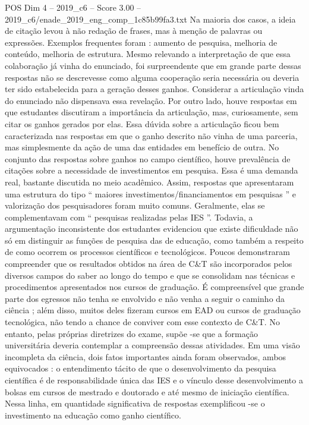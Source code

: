 \begin{textsample}{POS Dim 4 – 2019\_c6 – Score 3.00 – 2019\_c6/enade\_2019\_eng\_comp\_1c85b99fa3.txt}
Na maioria dos casos, a ideia de citação levou à não redação de frases, mas à menção de palavras ou expressões.
Exemplos frequentes foram : aumento de pesquisa, melhoria de conteúdo, melhoria de estrutura.
Mesmo relevando a interpretação de que essa colaboração já vinha do enunciado, foi surpreendente que em grande parte dessas respostas não se descrevesse como alguma cooperação seria necessária ou deveria ter sido estabelecida para a geração desses ganhos.
Considerar a articulação vinda do enunciado não dispensava essa revelação.
Por outro lado, houve respostas em que estudantes discutiram a importância da articulação, mas, curiosamente, sem citar os ganhos gerados por elas.
Essa dúvida sobre a articulação ficou bem caracterizada nas respostas em que o ganho descrito não vinha de uma parceria, mas simplesmente da ação de uma das entidades em benefício de outra.
No conjunto das respostas sobre ganhos no campo científico, houve prevalência de citações sobre a necessidade de investimentos em pesquisa.
Essa é uma demanda real, bastante discutida no meio acadêmico.
Assim, respostas que apresentaram uma estrutura do tipo “ maiores investimentos/financiamentos em pesquisas ” e valorização dos pesquisadores foram muito comuns.
Geralmente, elas se complementavam com “ pesquisas realizadas pelas IES ”.
Todavia, a argumentação inconsistente dos estudantes evidenciou que existe dificuldade não só em distinguir as funções de pesquisa das de educação, como também a respeito de como ocorrem os processos científicos e tecnológicos.
Poucos demonstraram compreender que os resultados obtidos na área de C\&T são incorporados pelos diversos campos do saber ao longo do tempo e que se consolidam nas técnicas e procedimentos apresentados nos cursos de graduação.
É compreensível que grande parte dos egressos não tenha se envolvido e não venha a seguir o caminho da ciência ; além disso, muitos deles fizeram cursos em EAD ou cursos de graduação tecnológica, não tendo a chance de conviver com esse contexto de C\&T.
No entanto, pelas próprias diretrizes do exame, supõe -se que a formação universitária deveria contemplar a compreensão dessas atividades.
Em uma visão incompleta da ciência, dois fatos importantes ainda foram observados, ambos equivocados : o entendimento tácito de que o desenvolvimento da pesquisa científica é de responsabilidade única das IES e o vínculo desse desenvolvimento a bolsas em cursos de mestrado e doutorado e até mesmo de iniciação científica.
Nessa linha, em quantidade significativa de respostas exemplificou -se o investimento na educação como ganho científico.

\end{textsample}
